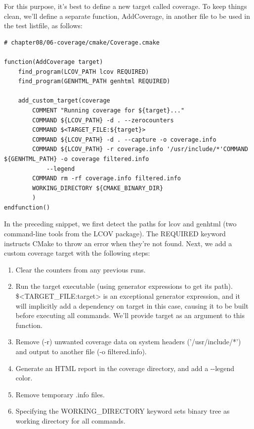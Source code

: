 For this purpose, it's best to define a new target called coverage. To keep things clean, we'll define a separate function, AddCoverage, in another file to be used in the test listfile, as follows:

\begin{lstlisting}[style=styleCMake]
# chapter08/06-coverage/cmake/Coverage.cmake

function(AddCoverage target)
	find_program(LCOV_PATH lcov REQUIRED)
	find_program(GENHTML_PATH genhtml REQUIRED)
	
	add_custom_target(coverage
		COMMENT "Running coverage for ${target}..."
		COMMAND ${LCOV_PATH} -d . --zerocounters
		COMMAND $<TARGET_FILE:${target}>
		COMMAND ${LCOV_PATH} -d . --capture -o coverage.info
		COMMAND ${LCOV_PATH} -r coverage.info '/usr/include/*'COMMAND ${GENHTML_PATH} -o coverage filtered.info
			--legend
		COMMAND rm -rf coverage.info filtered.info
		WORKING_DIRECTORY ${CMAKE_BINARY_DIR}
		)
endfunction()
\end{lstlisting}

In the preceding snippet, we first detect the paths for lcov and genhtml (two command-line tools from the LCOV package). The REQUIRED keyword instructs CMake to throw an error when they're not found. Next, we add a custom coverage target with the following steps:

\begin{enumerate}
\item 
Clear the counters from any previous runs.

\item 
Run the target executable (using generator expressions to get its path). \$<TARGET\_FILE:target> is an exceptional generator expression, and it will implicitly add a dependency on target in this case, causing it to be built before executing all commands. We'll provide target as an argument to this function.

\item 
Remove (-r) unwanted coverage data on system headers ('/usr/include/*') and output to another file (-o filtered.info).

\item 
Generate an HTML report in the coverage directory, and add a -{}-legend color.

\item 
Remove temporary .info files.

\item 
Specifying the WORKING\_DIRECTORY keyword sets binary tree as working directory for all commands.
\end{enumerate}

